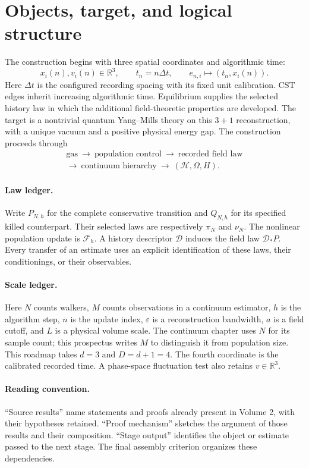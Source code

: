 \documentclass[11pt,a4paper]{article}
\begin{document}
\section*{Objects, target, and logical structure}
The construction begins with three spatial coordinates and algorithmic time:
\[
x_i(n),v_i(n)\in\mathbb R^3,\qquad t_n=n\Delta t,\qquad
e_{n,i}\mapsto(t_n,x_i(n)).
\]
Here \(\Delta t\) is the configured recording spacing with its fixed unit calibration. CST edges inherit increasing algorithmic time. Equilibrium supplies the selected history law in which the additional field-theoretic properties are developed. The target is a nontrivial quantum Yang--Mills theory on this \(3+1\) reconstruction, with a unique vacuum and a positive physical energy gap. The construction proceeds through
\[
\begin{gathered}\text{gas}\ \longrightarrow\ \text{population control}\ \longrightarrow\ \text{recorded field law}\\
\longrightarrow\ \text{continuum hierarchy}\ \longrightarrow\ (\mathcal H,\Omega,H).\end{gathered}
\]
\paragraph{Law ledger.} Write \(P_{N,h}\) for the complete conservative transition and \(Q_{N,h}\) for its specified killed counterpart. Their selected laws are respectively \(\pi_N\) and \(\nu_N\). The nonlinear population update is \(\mathcal F_h\). A history descriptor \(\mathscr D\) induces the field law \(\mathscr D_*P\). Every transfer of an estimate uses an explicit identification of these laws, their conditionings, or their observables.
\paragraph{Scale ledger.} Here \(N\) counts walkers, \(M\) counts observations in a continuum estimator, \(h\) is the algorithm step, \(n\) is the update index, \(\varepsilon\) is a reconstruction bandwidth, \(a\) is a field cutoff, and \(L\) is a physical volume scale. The continuum chapter uses \(N\) for its sample count; this prospectus writes \(M\) to distinguish it from population size. This roadmap takes \(d=3\) and \(D=d+1=4\). The fourth coordinate is the calibrated recorded time. A phase-space fluctuation test also retains \(v\in\mathbb R^3\).
\paragraph{Reading convention.} ``Source results'' name statements and proofs already present in Volume 2, with their hypotheses retained. ``Proof mechanism'' sketches the argument of those results and their composition. ``Stage output'' identifies the object or estimate passed to the next stage. The final assembly criterion organizes these dependencies.
\end{document}
